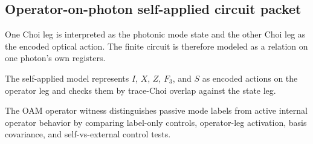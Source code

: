 \subsection{Operator-on-photon self-applied circuit packet}
\label{sec:bt1564-bt1566-operator-on-photon}

One Choi leg is interpreted as the photonic mode state and the other Choi leg as the encoded optical action.  The finite circuit is therefore modeled as a relation on one photon’s own registers.

The self-applied model represents $I$, $X$, $Z$, $F_3$, and $S$ as encoded actions on the operator leg and checks them by trace-Choi overlap against the state leg.

The OAM operator witness distinguishes passive mode labels from active internal operator behavior by comparing label-only controls, operator-leg activation, basis covariance, and self-vs-external control tests.
